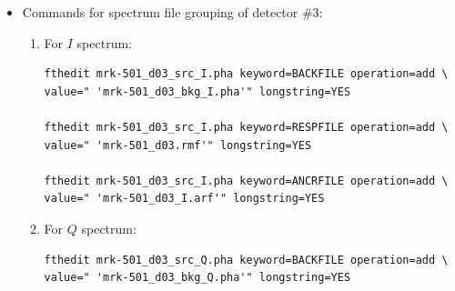 \begin{itemize}
\begin{enumerate}
\begin{verbatim}
fthedit mrk-501_d02_src_I.pha keyword=RESPFILE operation=add \
value=" 'mrk-501_d02.rmf'" longstring=YES

fthedit mrk-501_d02_src_I.pha keyword=ANCRFILE operation=add \
value=" 'mrk-501_d02_I.arf'" longstring=YES
        	\end{verbatim}
        	
        	\item For $Q$ spectrum:
        	\begin{verbatim}
fthedit mrk-501_d02_src_Q.pha keyword=BACKFILE operation=add \
value=" 'mrk-501_d02_bkg_Q.pha'" longstring=YES

fthedit mrk-501_d02_src_Q.pha keyword=RESPFILE operation=add \
value=" 'mrk-501_d02.rmf'" longstring=YES

fthedit mrk-501_d02_src_Q.pha keyword=ANCRFILE operation=add \
value=" 'mrk-501_d02_QU.mrf'" longstring=YES
        	\end{verbatim}
        	
        	\item For $U$ spectrum:
        	\begin{verbatim}
fthedit mrk-501_d02_src_U.pha keyword=BACKFILE operation=add \
value=" 'mrk-501_d02_bkg_U.pha'" longstring=YES

fthedit mrk-501_d02_src_U.pha keyword=RESPFILE operation=add \
value=" 'mrk-501_d02.rmf'" longstring=YES

fthedit mrk-501_d02_src_U.pha keyword=ANCRFILE operation=add \
value=" 'mrk-501_d02_QU.mrf'" longstring=YES
        	\end{verbatim}
        \end{enumerate}
        
        \item Commands for spectrum file grouping of detector \#3:
        \begin{enumerate}
        	\item For $I$ spectrum:
        	\begin{verbatim}
fthedit mrk-501_d03_src_I.pha keyword=BACKFILE operation=add \
value=" 'mrk-501_d03_bkg_I.pha'" longstring=YES

fthedit mrk-501_d03_src_I.pha keyword=RESPFILE operation=add \
value=" 'mrk-501_d03.rmf'" longstring=YES

fthedit mrk-501_d03_src_I.pha keyword=ANCRFILE operation=add \
value=" 'mrk-501_d03_I.arf'" longstring=YES
        	\end{verbatim}
        	
        	\item For $Q$ spectrum:
        	\begin{verbatim}
fthedit mrk-501_d03_src_Q.pha keyword=BACKFILE operation=add \
value=" 'mrk-501_d03_bkg_Q.pha'" longstring=YES


\end{verbatim}
\end{enumerate}
\end{itemize}
